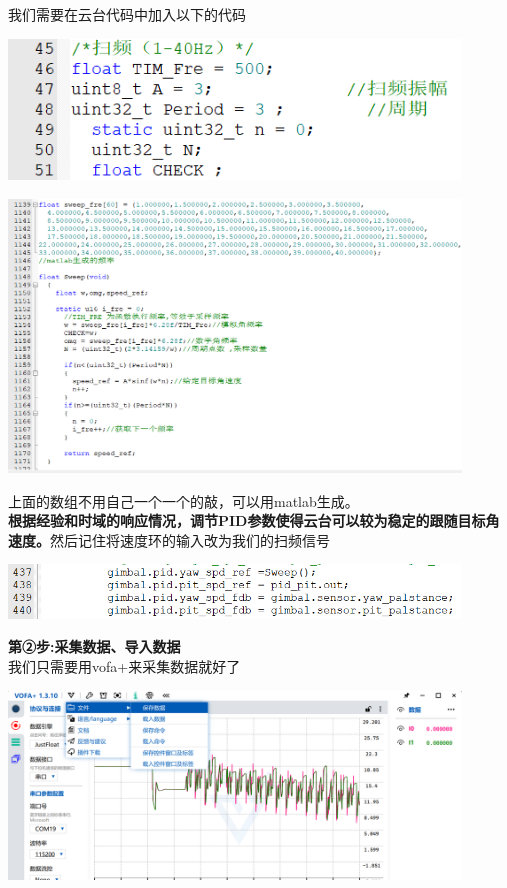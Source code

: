 \documentclass[UTF8,a4paper,12pt]{ctexart}
\begin{document}
\begin{flushleft}
       \begin{flushleft}
        我们需要在云台代码中加入以下的代码
       \end{flushleft}
      \par \includegraphics[width=12cm]{picture/sweep_1.png}
      \par \includegraphics[width=12cm]{picture/sweep_2.png}
      \begin{flushleft}
        上面的数组不用自己一个一个的敲，可以用matlab生成。\\
        \textbf{根据经验和时域的响应情况，调节PID参数使得云台可以较为稳定的跟随目标角速度。}然后记住将速度环的输入改为我们的扫频信号
      \end{flushleft}
      \par \includegraphics[width=12cm]{picture/sweep_3.png}
      \begin{flushleft}
        \textbf{第②步:采集数据、导入数据}\\
        我们只需要用vofa+来采集数据就好了
        \par \includegraphics[width=12cm]{picture/collection.png}

\end{flushleft}
\end{flushleft}
\end{document}
